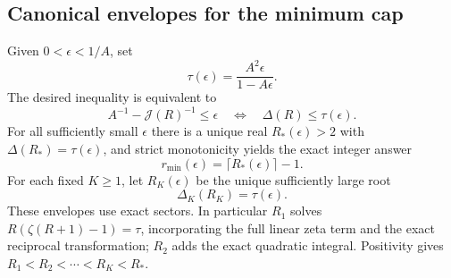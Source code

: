 \documentclass[11pt,letterpaper]{article}
\theoremstyle{remark}\newtheorem{remark}[theorem]{Remark}
\begin{document}
\subsection{Canonical envelopes for the minimum cap}
Given $0<\epsilon<1/A$, set
\begin{equation}\label{amc:bm:cap:tau}
 \tau(\epsilon)=\frac{A^2\epsilon}{1-A\epsilon}.
\end{equation}
The desired inequality is equivalent to
\[
 A^{-1}-\mathcal J(R)^{-1}\le\epsilon
 \quad\Longleftrightarrow\quad \Delta(R)\le\tau(\epsilon).
\]
For all sufficiently small $\epsilon$ there is a unique real $R_*(\epsilon)>2$ with $\Delta(R_*)=\tau(\epsilon)$, and strict monotonicity yields the exact integer answer
\begin{equation}\label{amc:bm:cap:integer-exact}
 r_{\min}(\epsilon)=\lceil R_*(\epsilon)\rceil-1.
\end{equation}
For each fixed $K\ge1$, let $R_K(\epsilon)$ be the unique sufficiently large root
\begin{equation}\label{amc:bm:cap:envelope-roots}
 \Delta_K(R_K)=\tau(\epsilon).
\end{equation}
These envelopes use exact sectors. In particular $R_1$ solves
$R(\zeta(R+1)-1)=\tau$, incorporating the full linear zeta term and the exact reciprocal transformation; $R_2$ adds the exact quadratic integral. Positivity gives
$R_1<R_2<\cdots<R_K<R_*$.
\end{document}
